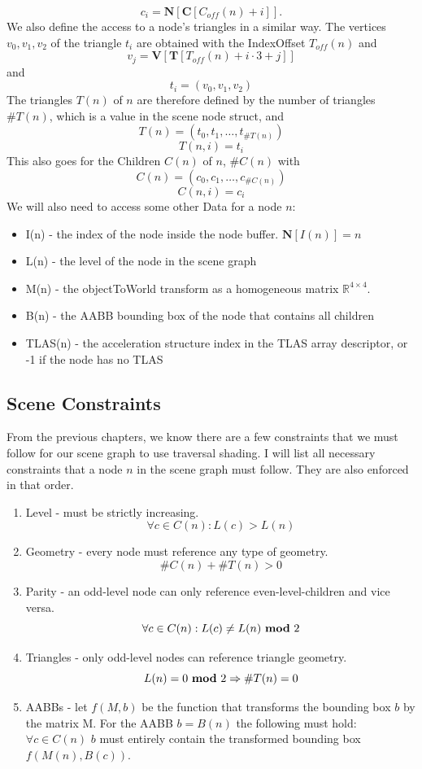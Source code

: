 \[c_i = \mathbf{N}[\mathbf{C}[C_{off}(n) + i]].\]
We also define the access to a node's triangles in a similar way. The vertices $v_0,v_1,v_2$ of the triangle $t_i$ are obtained with the IndexOffset $T_{off}(n)$ and
\[v_j = \mathbf{V}[\mathbf{T}[T_{off}(n) + i \cdot 3 + j]]\]
and
\[t_i = (v_0,v_1,v_2)\]
The triangles $T(n)$ of $n$ are therefore defined by the number of triangles $\#T(n)$, which is a value in the scene node struct, and
\[T(n) = (t_0,t_1,\dots,t_{\#T(n)})\]
\[T(n,i) = t_i\]
This also goes for the Children $C(n)$ of $n$, $\#C(n)$ with
\[C(n) = (c_0,c_1,\dots,c_{\#C(n)})\]
\[C(n,i) = c_i\]
We will also need to access some other Data for a node $n$:
\begin{itemize}
    \item I(n) - the index of the node inside the node buffer. $\mathbf{N}[I(n)] = n$
    \item L(n) - the level of the node in the scene graph
    \item M(n) - the objectToWorld transform as a homogeneous matrix $\mathbb{R}^{4\times4}$.
    \item B(n) - the AABB bounding box of the node that contains all children
    \item TLAS(n) - the acceleration structure index in the TLAS array descriptor, or -1 if the node has no TLAS
\end{itemize}
\subsection{Scene Constraints}
\label{sec:Constraints}
From the previous chapters, we know there are a few constraints that we must follow for our scene graph to use traversal shading. I will list all necessary constraints that a node $n$ in the scene graph must follow. They are also enforced in that order.
\begin{enumerate}
    \item Level - must be strictly increasing.
    \[\forall c \in C(n): L(c) > L(n)\]
    \item Geometry - every node must reference any type of geometry.
    \[\#C(n) + \#T(n) > 0\]
    \item Parity - an odd-level node can only reference even-level-children and vice versa.
    \[\forall c \in C(n): L(c) \neq L(n) \text{ $\mathbf{mod}$ $2$}\]
    \item Triangles - only odd-level nodes can reference triangle geometry.
    \[L(n) = 0 \text{ $\mathbf{mod}$ $2$} \Rightarrow \#T(n)=0\]
    \item AABBs - let $f(M,b)$ be the function that transforms the bounding box $b$ by the matrix M. For the AABB $b=B(n)$ the following must hold:\\
    $\forall c \in C(n)$ $b$ must entirely contain the transformed bounding box $f(M(n),B(c))$.
\end{enumerate}

